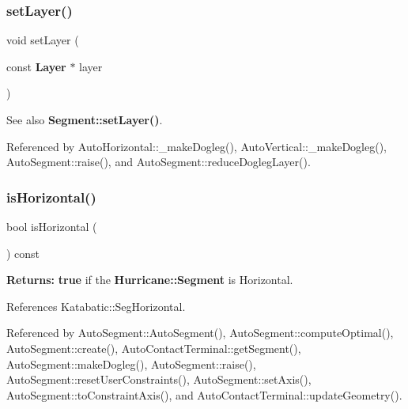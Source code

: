 \subsubsection{\texorpdfstring{set\+Layer()}{setLayer()}}
{\footnotesize\ttfamily void set\+Layer (\begin{DoxyParamCaption}\item[{const \textbf{ Layer} $\ast$}]{layer }\end{DoxyParamCaption})\hspace{0.3cm}{\ttfamily [inline]}}

\begin{DoxySeeAlso}{See also}
\textbf{ Segment\+::set\+Layer()}. 
\end{DoxySeeAlso}


Referenced by Auto\+Horizontal\+::\+\_\+make\+Dogleg(), Auto\+Vertical\+::\+\_\+make\+Dogleg(), Auto\+Segment\+::raise(), and Auto\+Segment\+::reduce\+Dogleg\+Layer().

\mbox{\label{classKatabatic_1_1AutoSegment_a21b9cefd33ae22e4c2070ad441bdd30b}} 
\subsubsection{\texorpdfstring{is\+Horizontal()}{isHorizontal()}}
{\footnotesize\ttfamily bool is\+Horizontal (\begin{DoxyParamCaption}{ }\end{DoxyParamCaption}) const\hspace{0.3cm}{\ttfamily [inline]}}

{\bfseries Returns\+:} {\bfseries true} if the \textbf{ Hurricane\+::\+Segment} is Horizontal. 

References Katabatic\+::\+Seg\+Horizontal.



Referenced by Auto\+Segment\+::\+Auto\+Segment(), Auto\+Segment\+::compute\+Optimal(), Auto\+Segment\+::create(), Auto\+Contact\+Terminal\+::get\+Segment(), Auto\+Segment\+::make\+Dogleg(), Auto\+Segment\+::raise(), Auto\+Segment\+::reset\+User\+Constraints(), Auto\+Segment\+::set\+Axis(), Auto\+Segment\+::to\+Constraint\+Axis(), and Auto\+Contact\+Terminal\+::update\+Geometry().

\mbox{\label{classKatabatic_1_1AutoSegment_abd54544ef1710ee4b67cfb021d73446c}} 
